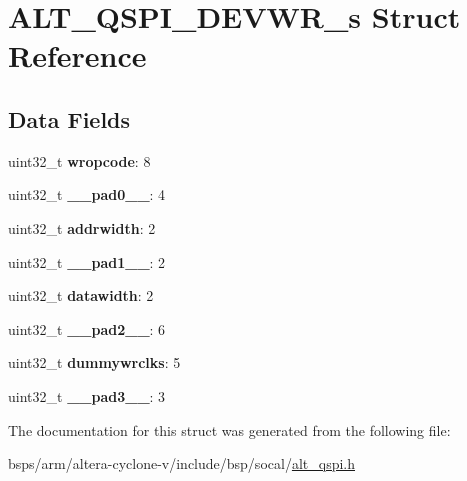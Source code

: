 \hypertarget{structALT__QSPI__DEVWR__s}{}\section{A\+L\+T\+\_\+\+Q\+S\+P\+I\+\_\+\+D\+E\+V\+W\+R\+\_\+s Struct Reference}
\label{structALT__QSPI__DEVWR__s}
\subsection*{Data Fields}
\begin{DoxyCompactItemize}
\item 
\mbox{\label{structALT__QSPI__DEVWR__s_a3db3ac67134a9adc40158a2bb0f2e576}} 
uint32\+\_\+t {\bfseries wropcode}\+: 8
\item 
\mbox{\label{structALT__QSPI__DEVWR__s_a2b8dbc866ab63461ad92c398f38f11a7}} 
uint32\+\_\+t {\bfseries \+\_\+\+\_\+pad0\+\_\+\+\_\+}\+: 4
\item 
\mbox{\label{structALT__QSPI__DEVWR__s_a0ea0a44b2c269634560186727b65832a}} 
uint32\+\_\+t {\bfseries addrwidth}\+: 2
\item 
\mbox{\label{structALT__QSPI__DEVWR__s_af64f22b17c340858d0f78457cf1466a6}} 
uint32\+\_\+t {\bfseries \+\_\+\+\_\+pad1\+\_\+\+\_\+}\+: 2
\item 
\mbox{\label{structALT__QSPI__DEVWR__s_ac87308d5b74ba32007309b799ed8f21d}} 
uint32\+\_\+t {\bfseries datawidth}\+: 2
\item 
\mbox{\label{structALT__QSPI__DEVWR__s_a785a96ba9299d23e272aa273095f8bc1}} 
uint32\+\_\+t {\bfseries \+\_\+\+\_\+pad2\+\_\+\+\_\+}\+: 6
\item 
\mbox{\label{structALT__QSPI__DEVWR__s_a908b51b347e87392a93d251b55296bc9}} 
uint32\+\_\+t {\bfseries dummywrclks}\+: 5
\item 
\mbox{\label{structALT__QSPI__DEVWR__s_ad4801a8a083cb9cb03f94f99a65273a6}} 
uint32\+\_\+t {\bfseries \+\_\+\+\_\+pad3\+\_\+\+\_\+}\+: 3
\end{DoxyCompactItemize}


The documentation for this struct was generated from the following file\+:\begin{DoxyCompactItemize}
\item 
bsps/arm/altera-\/cyclone-\/v/include/bsp/socal/\mbox{\hyperlink{include_2bsp_2socal_2alt__qspi_8h}{alt\+\_\+qspi.\+h}}\end{DoxyCompactItemize}
